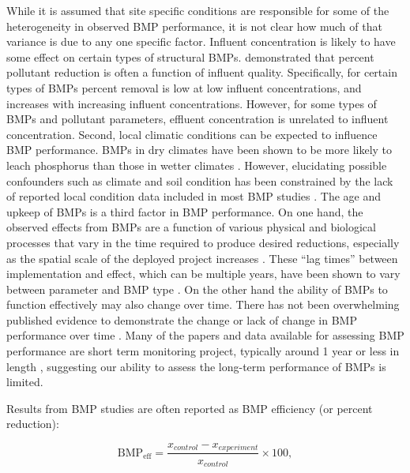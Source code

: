 \documentclass[utf8]{FrontiersinHarvard}
\begin{document}
While it is assumed that site specific conditions are responsible for some of the heterogeneity in observed BMP performance, it is not clear how much of that variance is due to any one specific factor.
Influent concentration is likely to have some effect on certain types of structural BMPs.
\citet{barrettPerformanceComparisonStructural2005} demonstrated that percent pollutant reduction is often a function of influent quality.
Specifically, for certain types of BMPs percent removal is low at low influent concentrations, and increases with increasing influent concentrations.
However, for some types of BMPs and pollutant parameters, effluent concentration is unrelated to influent concentration.
Second, local climatic conditions can be expected to influence BMP performance.
BMPs in dry climates have been shown to be more likely to leach phosphorus than those in wetter climates \citep{horvathEffectsRegionalClimate2023}.
However, elucidating possible confounders such as climate and soil condition has been constrained by the lack of reported local condition data included in most BMP studies \citep{horvathEffectsRegionalClimate2023, kochNitrogenRemovalStormwater2014, eagleMetaAnalysisConstrained2017}.
The age and upkeep of BMPs is a third factor in BMP performance.
On one hand, the observed effects from BMPs are a function of various physical and biological processes that vary in the time required to produce desired reductions, especially as the spatial scale of the deployed project increases \citep{mealsLagTimeWater2010}.
These ``lag times'' between implementation and effect, which can be multiple years, have been shown to vary between parameter and BMP type \citep{mealsLagTimeWater2010}.
On the other hand the ability of BMPs to function effectively may also change over time.
There has not been overwhelming published evidence to demonstrate the change or lack of change in BMP performance over time \citep{liuReviewEffectivenessBest2017}.
Many of the papers and data available for assessing BMP performance are short term monitoring project, typically around 1 year or less in length \citep{liuReviewEffectivenessBest2017, kochNitrogenRemovalStormwater2014}, suggesting our ability to assess the long-term performance of BMPs is limited.

Results from BMP studies are often reported as BMP efficiency (or percent reduction):

\[
\text{BMP}_{\text{eff}}=\frac{x_{control}-x_{experiment}}{x_{control}}\times 100,
\]
\end{document}
